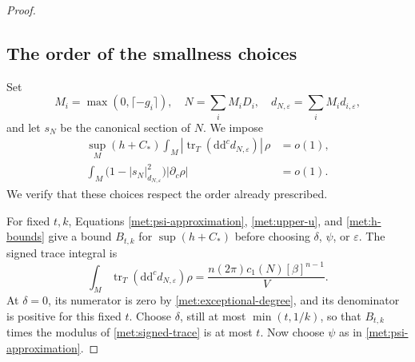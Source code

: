 \documentclass[11pt,letterpaper]{article}
\theoremstyle{definition}
\theoremstyle{remark}
\begin{document}
\begin{proof}
\subsection*{The order of the smallness choices}

Set
\[
 M_i=\max(0,\lceil-g_i\rceil),
 \quad N=\sum_i M_iD_i,
 \quad d_{N,\varepsilon}=\sum_i M_i d_{i,\varepsilon},
\]
and let \(s_N\) be the canonical section of \(N\).  We impose
\begin{equation}
 \label{met:exceptional-errors}
 \begin{split}
 \sup_M(h+C_*)\int_M
       |\operatorname{tr}_T(\mathrm{d}\mathrm{d}^{c} d_{N,\varepsilon})|\,\rho&=o(1),\\
 \int_M\bigl(1-|s_N|_{d_{N,\varepsilon}}^2\bigr)
       |\partial_c\rho|&=o(1).
 \end{split}
\end{equation}
We verify that these choices respect the order already prescribed.

For fixed \(t,k\), Equations \eqref{met:psi-approximation},
\eqref{met:upper-u}, and \eqref{met:h-bounds} give a bound
\(B_{t,k}\) for \(\sup(h+C_*)\) before choosing \(\delta\),
\(\psi\), or \(\varepsilon\).  The signed trace integral is
\begin{equation}
 \label{met:signed-trace}
 \int_M\operatorname{tr}_T(\mathrm{d}\mathrm{d}^{c} d_{N,\varepsilon})\rho
   =\frac{n(2\pi)c_1(N)[\beta]^{n-1}}V.
\end{equation}
At \(\delta=0\), its numerator is zero by
\eqref{met:exceptional-degree}, and its denominator is positive for
this fixed \(t\).  Choose \(\delta\), still at most \(\min(t,1/k)\),
so that \(B_{t,k}\) times the modulus of
\eqref{met:signed-trace} is at most \(t\).  Now choose \(\psi\) as in
\eqref{met:psi-approximation}.


\end{proof}
\end{document}
